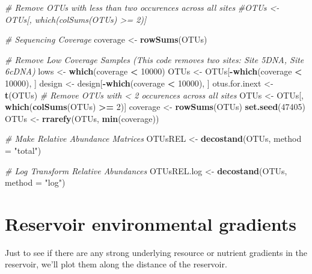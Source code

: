 \documentclass[]{article}
\newenvironment{Shaded}{\begin{snugshade}}{\end{snugshade}}
\newcommand{\CommentTok}[1]{\textcolor[rgb]{0.56,0.35,0.01}{\textit{#1}}}
\newcommand{\DataTypeTok}[1]{\textcolor[rgb]{0.13,0.29,0.53}{#1}}
\newcommand{\DecValTok}[1]{\textcolor[rgb]{0.00,0.00,0.81}{#1}}
\newcommand{\KeywordTok}[1]{\textcolor[rgb]{0.13,0.29,0.53}{\textbf{#1}}}
\newcommand{\NormalTok}[1]{#1}
\newcommand{\OperatorTok}[1]{\textcolor[rgb]{0.81,0.36,0.00}{\textbf{#1}}}
\newcommand{\StringTok}[1]{\textcolor[rgb]{0.31,0.60,0.02}{#1}}
\begin{document}
\begin{Shaded}
\begin{Highlighting}[]
\CommentTok{# Remove OTUs with less than two occurences across all sites}
\CommentTok{#OTUs <- OTUs[, which(colSums(OTUs) >= 2)]}

\CommentTok{# Sequencing Coverage}
\NormalTok{coverage <-}\StringTok{ }\KeywordTok{rowSums}\NormalTok{(OTUs)}

\CommentTok{# Remove Low Coverage Samples (This code removes two sites: Site 5DNA, Site 6cDNA)}
\NormalTok{lows <-}\StringTok{ }\KeywordTok{which}\NormalTok{(coverage }\OperatorTok{<}\StringTok{ }\DecValTok{10000}\NormalTok{)}
\NormalTok{OTUs <-}\StringTok{ }\NormalTok{OTUs[}\OperatorTok{-}\KeywordTok{which}\NormalTok{(coverage }\OperatorTok{<}\StringTok{ }\DecValTok{10000}\NormalTok{), ]}
\NormalTok{design <-}\StringTok{ }\NormalTok{design[}\OperatorTok{-}\KeywordTok{which}\NormalTok{(coverage }\OperatorTok{<}\StringTok{ }\DecValTok{10000}\NormalTok{), ]}
\NormalTok{otus.for.inext <-}\StringTok{  }\KeywordTok{t}\NormalTok{(OTUs)}
\CommentTok{# Remove OTUs with < 2 occurences across all sites}
\NormalTok{OTUs <-}\StringTok{ }\NormalTok{OTUs[, }\KeywordTok{which}\NormalTok{(}\KeywordTok{colSums}\NormalTok{(OTUs) }\OperatorTok{>=}\StringTok{ }\DecValTok{2}\NormalTok{)]}
\NormalTok{coverage <-}\StringTok{ }\KeywordTok{rowSums}\NormalTok{(OTUs)}
\KeywordTok{set.seed}\NormalTok{(}\DecValTok{47405}\NormalTok{)}
\NormalTok{OTUs <-}\StringTok{ }\KeywordTok{rrarefy}\NormalTok{(OTUs, }\KeywordTok{min}\NormalTok{(coverage))}

\CommentTok{# Make Relative Abundance Matrices}
\NormalTok{OTUsREL <-}\StringTok{ }\KeywordTok{decostand}\NormalTok{(OTUs, }\DataTypeTok{method =} \StringTok{"total"}\NormalTok{)}

\CommentTok{# Log Transform Relative Abundances}
\NormalTok{OTUsREL.log <-}\StringTok{ }\KeywordTok{decostand}\NormalTok{(OTUs, }\DataTypeTok{method =} \StringTok{"log"}\NormalTok{)}
\end{Highlighting}
\end{Shaded}

\hypertarget{reservoir-environmental-gradients}{%
\section{Reservoir environmental
gradients}\label{reservoir-environmental-gradients}}

Just to see if there are any strong underlying resource or nutrient
gradients in the reservoir, we'll plot them along the distance of the
reservoir.
\end{document}
